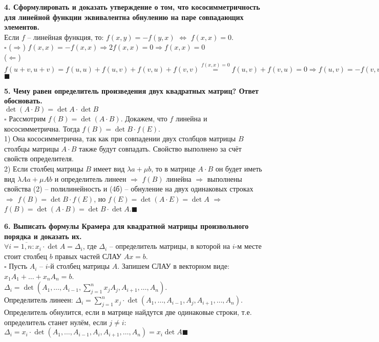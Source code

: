 \documentclass[11pt,a4paper]{article}
\newcommand{\proof}{$\square$ }
\newcommand{\qed}{\hfill$\blacksquare$}
\begin{document}
\textbf{4. Сформулировать и доказать утверждение о том, что кососимметричность для линейной функции эквивалентна обнулению на паре совпадающих элементов.\\}
Если $f$ -- линейная функция, то: $f(x, y) = -f(y, x)$ $\Leftrightarrow$ $f(x, x) = 0$.\\
\proof ($\Rightarrow$) $f(x, x) = -f(x, x) \Rightarrow 2 f(x, x) = 0 \Rightarrow f(x, x) = 0$\\
($\Leftarrow$) $f(u+v, u+v) = f(u, u) + f(u, v) + f(v, u) + f(v, v) \stackrel{f(x, x) = 0}{=} f(u, v) + f(v, u) = 0 \Rightarrow f(u, v) = -f(v, u)$\qed

\textbf{5. Чему равен определитель произведения двух квадратных матриц? Ответ обосновать.\\}
$\det (A \cdot B) = \det A \cdot \det B$\\
\proof Рассмотрим $f(B) = \det (A \cdot B)$. Докажем, что $f$ линейна и кососимметрична. Тогда $f(B) = \det B \cdot f(E)$.\\
1) Она кососимметрична, так как при совпадении двух столбцов матрицы $B$ столбцы матрицы $A \cdot B$ также будут совпадать. Свойство выполнено за счёт свойств определителя.\\
2) Если столбец матрицы $B$ имеет вид $\lambda a + \mu b$, то в матрице $A \cdot B$ он будет иметь вид $\lambda Aa + \mu Ab$ и определитель линеен $\Rightarrow$ $f(B)$ линейна $\Rightarrow$ выполнены свойства (2) -- полилинейность и (4б) -- обнуление на двух одинаковых строках $\Rightarrow$ $f(B) = \det B \cdot f(E)$, но $f(E) = \det (A \cdot E) = \det A$ $\Rightarrow$ $f(B) = \det (A \cdot B ) = \det B \cdot \det A$.\qed

\textbf{6. Выписать формулы Крамера для квадратной матрицы произвольного порядка и доказать их.\\}
$\forall i = \overline{1, n}: x_i \cdot \det A = \Delta_i$, где $\Delta_i$ -- определитель матрицы, в которой на $i$-м месте стоит столбец $b$ правых частей СЛАУ $Ax = b$.\\
\proof Пусть $A_i$ -- $i$-й столбец матрицы $A$. Запишем СЛАУ в векторном виде: $x_1 A_1 + \hdots + x_n A_n = b$.\\
$\Delta_i = \det \left(A_1, \hdots, A_{i-1}, \sum_{j = 1}^n x_j A_j, A_{i+1}, \hdots, A_n\right)$.\\
Определитель линеен: $\Delta_i = \sum_{j = 1}^n x_j \cdot \det \left( A_1, \hdots, A_{i-1}, A_j, A_{i+1}, \hdots, A_n \right)$.\\
Определитель обнулится, если в матрице найдутся две одинаковые строки, т.е. определитель станет нулём, если $j \neq i$:\\
$\Delta_i = x_i \cdot \det \left( A_1, \hdots, A_{i-1}, A_i, A_{i+1}, \hdots, A_n \right) = x_i \det A$\qed
\end{document}
